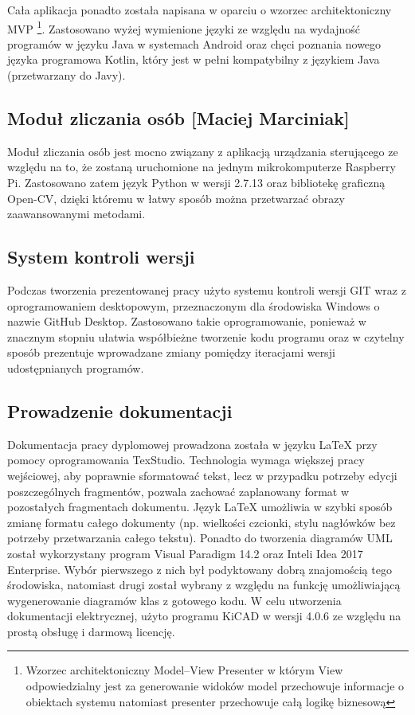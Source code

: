 \documentclass[twoside,10pt]{article}
\begin{document}
Cała aplikacja ponadto została napisana w oparciu o wzorzec architektoniczny MVP \footnote{ Wzorzec architektoniczny Model--View Presenter w którym View odpowiedzialny jest za generowanie widoków model przechowuje informacje o obiektach systemu natomiast presenter przechowuje całą logikę biznesową}. Zastosowano wyżej wymienione języki ze względu na wydajność programów w języku Java w systemach Android oraz chęci poznania nowego języka programowa Kotlin, który jest w pełni kompatybilny z językiem Java (przetwarzany do Javy).  

\subsection{Moduł zliczania osób [Maciej Marciniak]}
Moduł zliczania osób jest mocno związany z aplikacją urządzania sterującego ze względu na to, że zostaną uruchomione na jednym mikrokomputerze Raspberry Pi. Zastosowano zatem język Python w wersji 2.7.13 oraz bibliotekę graficzną Open-CV, dzięki któremu w łatwy sposób można przetwarzać obrazy zaawansowanymi metodami. 

\subsection{System kontroli wersji}
Podczas tworzenia prezentowanej pracy użyto systemu kontroli wersji GIT wraz z  oprogramowaniem desktopowym, przeznaczonym dla środowiska Windows o nazwie GitHub Desktop. Zastosowano takie oprogramowanie, ponieważ w znacznym stopniu ułatwia współbieżne tworzenie kodu programu oraz w czytelny sposób prezentuje wprowadzane zmiany pomiędzy iteracjami wersji udostępnianych programów. 

\subsection{Prowadzenie dokumentacji}
Dokumentacja pracy dyplomowej prowadzona została w języku LaTeX przy pomocy oprogramowania \linebreak TexStudio. Technologia wymaga większej pracy wejściowej, aby poprawnie sformatować tekst, lecz w przypadku potrzeby edycji poszczególnych fragmentów, pozwala zachować zaplanowany format w pozostałych fragmentach dokumentu. Język LaTeX umożliwia w szybki sposób zmianę formatu całego dokumenty (np. wielkości czcionki, stylu nagłówków bez potrzeby przetwarzania całego tekstu). Ponadto do tworzenia diagramów UML został wykorzystany program Visual Paradigm 14.2 oraz Inteli Idea 2017 Enterprise. Wybór pierwszego z nich był podyktowany dobrą znajomością tego środowiska, natomiast drugi został wybrany z względu na funkcję umożliwiającą wygenerowanie diagramów klas z gotowego kodu. W celu utworzenia dokumentacji elektrycznej, użyto programu KiCAD w wersji 4.0.6 ze względu na prostą obsługę i darmową licencję.
 
\end{document}
